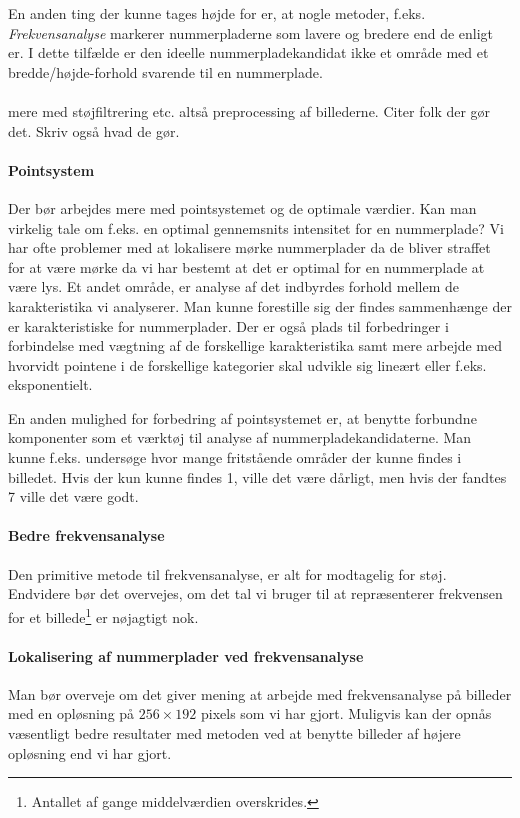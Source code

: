 En anden ting der kunne tages højde for er, at nogle metoder, f.eks. \textit{Frekvensanalyse} markerer nummerpladerne som lavere og bredere end de enligt er. I dette tilfælde er den ideelle nummerpladekandidat ikke et område med et bredde/højde-forhold svarende til en nummerplade.

\paragraph{}

 mere med støjfiltrering etc. altså preprocessing af billederne. Citer folk der gør det. Skriv også hvad de gør.

\paragraph{Pointsystem}
Der bør arbejdes mere med pointsystemet og de optimale værdier. Kan man virkelig tale om f.eks. en optimal gennemsnits intensitet for en nummerplade? Vi har ofte problemer med at lokalisere mørke nummerplader da de bliver straffet for at være mørke da vi har bestemt at det er optimal for en nummerplade at være lys. Et andet område, er analyse af det indbyrdes forhold mellem de karakteristika vi analyserer. Man kunne forestille sig der findes sammenhænge der er karakteristiske for nummerplader. Der er også plads til forbedringer i forbindelse med vægtning af de forskellige karakteristika samt mere arbejde med hvorvidt pointene i de forskellige kategorier skal udvikle sig lineært eller f.eks. eksponentielt.

En anden mulighed for forbedring af pointsystemet er, at benytte forbundne komponenter som et værktøj til analyse af nummerpladekandidaterne. Man kunne f.eks. undersøge hvor mange fritstående områder der kunne findes i billedet. Hvis der kun kunne findes 1, ville det være dårligt, men hvis der fandtes 7 ville det være godt. 

\paragraph{Bedre frekvensanalyse}
Den primitive metode til frekvensanalyse, er alt for modtagelig for støj. Endvidere bør det overvejes, om det tal vi bruger til at repræsenterer frekvensen for et billede\footnote{Antallet af gange middelværdien overskrides.} er nøjagtigt nok.

\paragraph{Lokalisering af nummerplader ved frekvensanalyse}
Man bør overveje om det giver mening at arbejde med frekvensanalyse på billeder med en opløsning på $256 \times 192$ pixels som vi har gjort. Muligvis kan der opnås væsentligt bedre resultater med metoden ved at benytte billeder af højere opløsning end vi har gjort.

